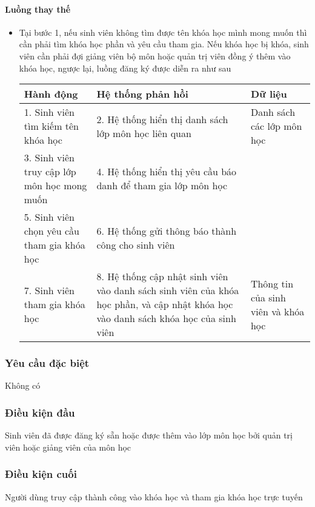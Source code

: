 \documentclass[./../main_file.tex]{subfiles}
\begin{document}
\paragraph{Luồng thay thế}
\begin{itemize}
	\item Tại bước 1, nếu sinh viên không tìm được tên khóa học mình mong muốn thì cần phải tìm khóa học phần và yêu cầu tham gia. Nếu khóa học bị khóa, sinh viên cần phải đợi giảng viên bộ môn hoặc quản trị viên đồng ý thêm vào khóa học, ngược lại, luồng đăng ký được diễn ra như sau
	\begin{longtable}{|p{}|p{}|p{}|}
			\hline
			\textbf{Hành động}                          & \textbf{Hệ thống phản hồi}                                    & \textbf{Dữ liệu}          \\ \hline
			1. Sinh viên tìm kiếm tên khóa học           & 2. Hệ thống hiển thị danh sách lớp môn học liên quan          & Danh sách các lớp môn học \\ \hline
			3. Sinh viên truy cập lớp môn học mong muốn & 4. Hệ thống hiển thị yêu cầu báo danh để tham gia lớp môn học &                           \\ \hline
			5. Sinh viên chọn  yêu cầu tham gia khóa học & 6. Hệ thống gửi thông báo thành công cho sinh viên            &                           \\ \hline
			7. Sinh viên tham gia khóa học &
			8. Hệ thống cập nhật sinh viên vào danh sách sinh viên của khóa học phần, và cập nhật khóa học vào danh sách khóa học của sinh viên &
			Thông tin của sinh viên và khóa học \\ \hline
	\end{longtable}
\end{itemize}
\subsubsection{Yêu cầu đặc biệt}
Không có

\subsubsection{Điều kiện đầu}
Sinh viên đã được đăng ký sẵn hoặc được thêm vào lớp môn học bởi quản trị viên hoặc giảng viên của môn học

\subsubsection{Điều kiện cuối}
Người dùng truy cập thành công vào khóa học và tham gia khóa học trực tuyến
\end{document}
